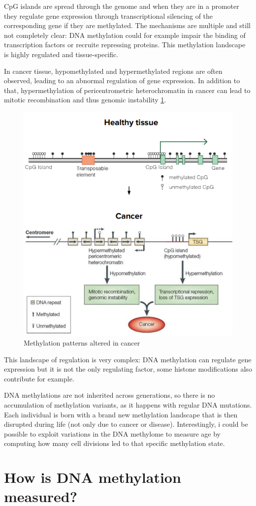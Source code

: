 CpG islands are spread through the genome and when they are in a promoter they
regulate gene expression through transcriptional silencing of the corresponding
gene if they are methylated. The mechanisms are multiple and still not
completely clear: DNA methylation could for example impair the binding of
transcription factors or recruite repressing proteins. This methylation
landscape is highly regulated and tissue-specific.

In cancer tissue, hypomethylated and hypermethylated regions are often observed,
leading to an abnormal regulation of gene expression. In addition to that,
hypermethylation of pericentrometric heterochromatin in cancer can lead to
mitotic recombination and thus genomic instability \ref{fig:cancer}.

\begin{figure}[!ht]
\centering
    \includegraphics[width=0.5\linewidth]{cancerMet.png}
    \caption{\label{fig:cancer}Methylation patterns altered in cancer}
\end{figure}

This landscape of regulation is very complex: DNA methylation can regulate gene
expression but it is not the only regulating factor, some histone modifications
also contribute for example.

DNA methylations are not inherited across generations, so there is no
accumulation of methylation variants, as it happens with regular DNA mutations.
Each individual is born with a brand new methylation landscape that is then
disrupted during life (not only due to cancer or disease). Interestingly, i
could be possible to exploit variations in the DNA methylome to measure age by
computing how many cell divisions led to that specific methylation state.

\section{How is DNA methylation measured?}

